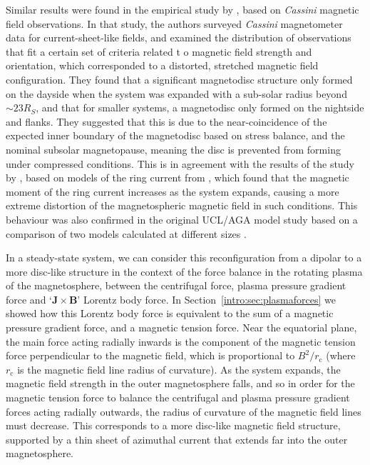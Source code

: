 Similar results were found in the empirical study by \citet{arridge2008}, based on \textit{Cassini} magnetic field observations. In that study, the authors surveyed \textit{Cassini} magnetometer data for current-sheet-like fields, and examined the distribution of observations that fit a certain set of criteria related t o magnetic field strength and orientation, which corresponded to a distorted, stretched magnetic field configuration. They found that a significant magnetodisc structure only formed on the dayside when the system was expanded with a sub-solar radius beyond ${\sim}{23}{R_S}$, and that for smaller systems, a magnetodisc only formed on the nightside and flanks. They suggested that this is due to the near-coincidence of the expected inner boundary of the magnetodisc based on stress balance, and the nominal subsolar magnetopause, meaning the disc is prevented from forming under compressed conditions. This is in agreement with the results of the study by \citet{bunce2008}, based on models of the ring current from \citet{bunce2007}, which found that the magnetic moment of the ring current increases as the system expands, causing a more extreme distortion of the magnetospheric magnetic field in such conditions. This behaviour was also confirmed in the original UCL/AGA model study based on a comparison of two models calculated at different sizes \citep{achilleos2010a}.

In a steady-state system, we can consider this reconfiguration from a dipolar to a more disc-like structure in the context of the force balance in the rotating plasma of the magnetosphere, between the centrifugal force, plasma pressure gradient force and `$\boldsymbol{J}\times\boldsymbol{B}$' Lorentz body force. In Section~\ref{intro:sec:plasmaforces} we showed how this Lorentz body force is equivalent to the sum of a magnetic pressure gradient force, and a magnetic tension force. Near the equatorial plane, the main force acting radially inwards is the component of the magnetic tension force perpendicular to the magnetic field, which is proportional to $B^2/r_\mathrm{c}$ (where $r_\mathrm{c}$ is the magnetic field line radius of curvature). As the system expands, the magnetic field strength in the outer magnetosphere falls, and so in order for the magnetic tension force to balance the centrifugal and plasma pressure gradient forces acting radially outwards, the radius of curvature of the magnetic field lines must decrease. This corresponds to a more disc-like magnetic field structure, supported by a thin sheet of azimuthal current that extends far into the outer magnetosphere. 

